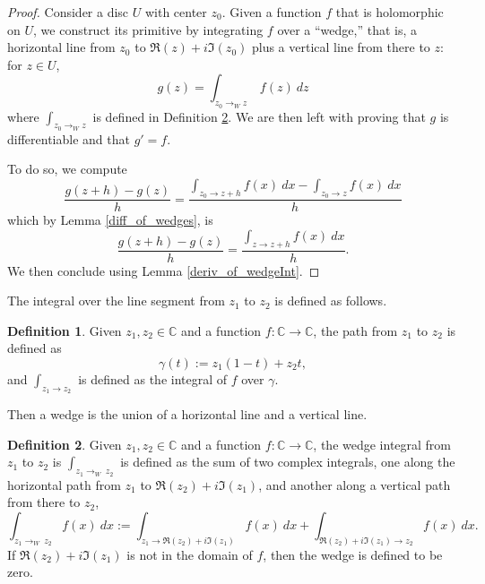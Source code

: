\documentclass{report}
\theoremstyle{definition}
\newtheorem{definition}{Definition}
\begin{document}
\begin{proof}
  Consider a disc $U$ with center $z_0$.
  Given a function $f$ that is holomorphic on $U$, we construct its primitive by integrating $f$ over a ``wedge,'' that is, a horizontal line from $z_0$ to $ \Re(z)+ i \Im(z_0)$ plus a vertical line from there to $z$: for $z\in U$,
  \begin{equation}
    g(z)=\int_{z_0\to_W z}\ f(z)\ dz
  \end{equation}
  where $\int_{z_0\to_W z}$ is defined in Definition \ref{WedgeInt}.
  We are then left with proving that $g$ is differentiable and that $g'=f$.

  To do so, we compute
  \begin{equation}
    \frac{g(z+h)-g(z)}h
    =
    \frac{\int_{z_0\to z+h} f(x)\ dx-\int_{z_0\to z} f(x)\ dx}h
  \end{equation}
  which by Lemma \ref{diff_of_wedges}, is
  \begin{equation}
    \frac{g(z+h)-g(z)}h
    =
    \frac{\int_{z\to z+h} f(x)\ dx}h
    .
  \end{equation}
  We then conclude using Lemma \ref{deriv_of_wedgeInt}.
\end{proof}

The integral over the line segment from $z_1$ to $z_2$ is defined as follows.

\begin{definition}
  \label{linint}
  \leanok
  Given $z_1,z_2\in\mathbb C$ and a function $f:\mathbb C\to\mathbb C$, the path from $z_1$ to $z_2$ is defined as
  \begin{equation}
    \gamma(t):=z_1(1-t)+z_2 t,
  \end{equation}
  and $\int_{z_1\to z_2}$ is defined as the integral of $f$ over $\gamma$.
\end{definition}

Then a wedge is the union of a horizontal line and a vertical line.

\begin{definition}
  \label{WedgeInt}
  Given $z_1,z_2\in\mathbb C$ and a function $f:\mathbb C\to\mathbb C$, the wedge integral from $z_1$ to $z_2$ is 
   $\int_{z_1\to_W\  z_2}$ is defined as the sum of two  complex integrals, one along the horizontal path from $z_1$ to $\Re(z_2)+i \Im(z_1)$, and another along a vertical path from there to $z_2$,
   \begin{equation}
      \int_{z_1\to_W\  z_2} f(x)\ dx
      :=
      \int_{z_1\to\Re(z_2)+i \Im(z_1)} f(x)\ dx
      +
      \int_{\Re(z_2)+i \Im(z_1)\to z_2} f(x)\ dx
      .
   \end{equation}
   If $\Re(z_2)+i \Im(z_1)$ is not in the domain of $f$, then the wedge is defined to be zero.
\end{definition}
\end{document}
